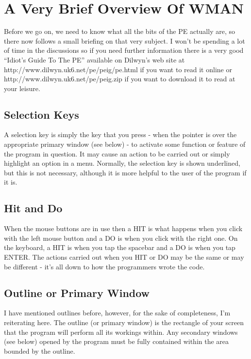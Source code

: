 \section{A Very Brief Overview Of WMAN}
\label{ch22-overview}%

Before we go on, we need to know what all the bits of the PE
    actually are, so there now follows a small briefing on that very subject.
    I won't be spending a lot of time in the discussions so if you need
    further information there is a very good ``Idiot's Guide To The PE''
    available on Dilwyn's web site at
    http://www.dilwyn.uk6.net/pe/peig/pe.html if you want to read it online or
    http://www.dilwyn.uk6.net/pe/peig.zip if you want to download it to read
    at your leisure.

\subsection{Selection Keys}
\label{ch22-sel-keys}%

A selection key is simply the key that you press -{} when the
      pointer is over the appropriate primary window (see below) -{} to activate
      some function or feature of the program in question. It may cause an
      action to be carried out or simply highlight an option in a menu.
      Normally, the selection key is shown underlined, but this is not
      necessary, although it is more helpful to the user of the program if it
      is.

\subsection{Hit and Do}
\label{ch22-hit-do}%

When the mouse buttons are in use then a HIT is what happens when
      you click with the left mouse button and a DO is when you click with the
      right one. On the keyboard, a HIT is when you tap the spacebar and a DO
      is when you tap ENTER. The actions carried out when you HIT or DO may be
      the same or may be different -{} it's all down to how the programmers
      wrote the code.

\subsection{Outline or Primary Window}
\label{ch22-outln}%

I have mentioned outlines before, however, for the sake of
      completeness, I'm reiterating here. The outline (or primary window) is
      the rectangle of your screen that the program will perform all its
      workings within. Any secondary windows (see below) opened by the program
      must be fully contained within the area bounded by the outline.

